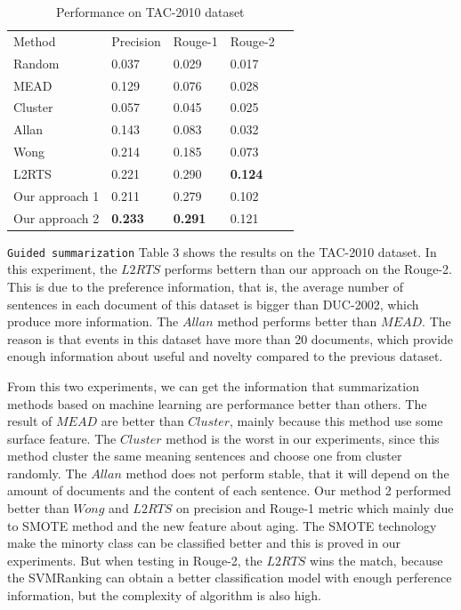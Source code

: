 \documentclass[print]{jicspack}
\begin{document}
\begin{table}
\caption{Performance on TAC-2010 dataset }
\centering
\begin{tabular}{lllll}
\hline\noalign{\smallskip}
Method   &  Precision   & Rouge-1  &Rouge-2  \\
\noalign{\smallskip}
\hline
\noalign{\smallskip}
Random &  0.037           &      0.029                &  0.017									\\
MEAD    &	0.129			& 		0.076	 			&	0.028					 				\\
Cluster	&	0.057			&		0.045				&	0.025				 				     \\
Allan		&	0.143			&		0.083				&	0.032						 			\\
Wong		&	0.214			&		0.185				&	0.073									\\
L2RTS	&	0.221			&		0.290				&	\textbf{0.124}					 	\\
Our approach 1	&	0.211	&	0.279			&	0.102		          \\
Our approach 2	&	\textbf{0.233}	&	\textbf{0.291}				&	0.121		          \\
\hline
\end{tabular}
\end{table}

\texttt{Guided summarization} Table 3 shows the results on the TAC-2010 dataset.
In this experiment, the $L2RTS$ performs bettern than our approach on the Rouge-2.
This is due to the preference information, that is, the average number of sentences in each document of this dataset is bigger than DUC-2002, which produce more information.
The $Allan$ method performs better than $MEAD$.
The reason is that events in this dataset have more than 20 documents, which provide enough information about useful and novelty compared to the previous dataset.

From this two experiments, we can get the information that summarization methods based on machine learning are performance better than others. 
The result of $MEAD$ are better than $Cluster$, mainly because this method use some surface feature.
The $Cluster$ method is the worst in our experiments, since this method cluster the same meaning sentences and choose one from cluster randomly. 
The $Allan$ method does not perform stable, that it will depend on the amount of documents and the content of each sentence. 
Our method 2 performed better than $Wong$ and $L2RTS$ on precision and Rouge-1 metric which mainly due to  SMOTE method and the new feature about aging. 
The SMOTE technology make the minorty class can be classified better and this is proved in our experiments.
But when testing in Rouge-2, the $L2RTS$ wins the match, because the SVMRanking can obtain a better classification model with enough perference information, but the complexity of algorithm is also high.
\end{document}
